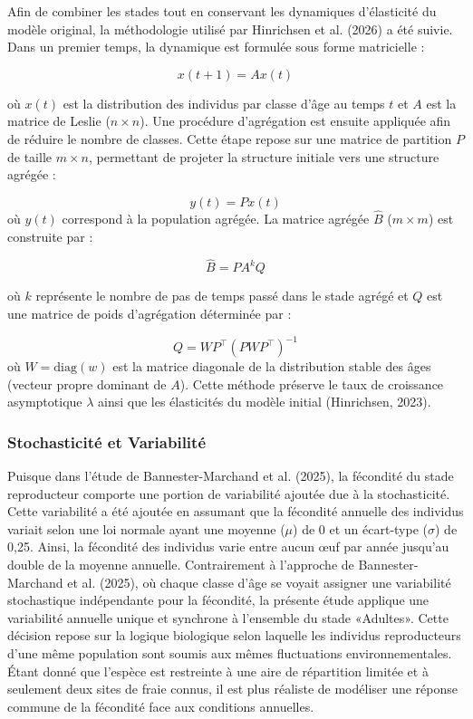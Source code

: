 \documentclass[9pt,twocolumn,twoside,]{pnas-new}
\begin{document}
Afin de combiner les stades tout en conservant les dynamiques
d'élasticité du modèle original, la méthodologie utilisé par Hinrichsen
et al. (2026) a été suivie. Dans un premier temps, la dynamique est
formulée sous forme matricielle :

\[
x(t+1) = Ax(t)
\]

\noindent où \(x(t)\) est la distribution des individus par classe d'âge
au temps \(t\) et \(A\) est la matrice de Leslie (\(n \times n\)). Une
procédure d'agrégation est ensuite appliquée afin de réduire le nombre
de classes. Cette étape repose sur une matrice de partition \(P\) de
taille \(m \times n\), permettant de projeter la structure initiale vers
une structure agrégée :

\[
y(t) = Px(t)
\] \noindent où \(y(t)\) correspond à la population agrégée. La matrice
agrégée \(\hat{B}\) (\(m \times m\)) est construite par :

\[
\hat{B} = PA^kQ
\]

\noindent où \(k\) représente le nombre de pas de temps passé dans le
stade agrégé et \(Q\) est une matrice de poids d'agrégation déterminée
par :

\[
Q = WP^\top(PWP^\top)^{-1}
\] \noindent où \(W = \text{diag}(w)\) est la matrice diagonale de la
distribution stable des âges (vecteur propre dominant de \(A\)). Cette
méthode préserve le taux de croissance asymptotique \(\lambda\) ainsi
que les élasticités du modèle initial (Hinrichsen, 2023).

\subsubsection*{Stochasticité et
Variabilité}\label{stochasticituxe9-et-variabilituxe9}

Puisque dans l'étude de Bannester-Marchand et al. (2025), la fécondité
du stade reproducteur comporte une portion de variabilité ajoutée due à
la stochasticité. Cette variabilité a été ajoutée en assumant que la
fécondité annuelle des individus variait selon une loi normale ayant une
moyenne (\(\mu\)) de 0 et un écart-type (\(\sigma\)) de 0,25. Ainsi, la
fécondité des individus varie entre aucun œuf par année jusqu'au double
de la moyenne annuelle. Contrairement à l'approche de Bannester-Marchand
et al. (2025), où chaque classe d'âge se voyait assigner une variabilité
stochastique indépendante pour la fécondité, la présente étude applique
une variabilité annuelle unique et synchrone à l'ensemble du stade
«Adultes». Cette décision repose sur la logique biologique selon
laquelle les individus reproducteurs d'une même population sont soumis
aux mêmes fluctuations environnementales. Étant donné que l'espèce est
restreinte à une aire de répartition limitée et à seulement deux sites
de fraie connus, il est plus réaliste de modéliser une réponse commune
de la fécondité face aux conditions annuelles.
\end{document}
